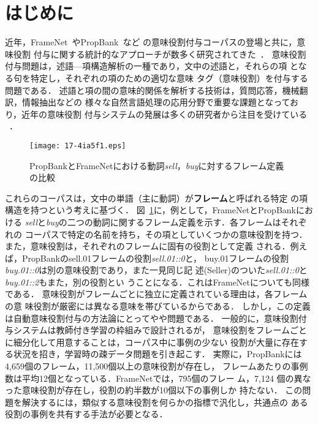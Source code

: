 \documentclass[japanese]{jnlp_1.4}
\begin{document}
\maketitle


\section{はじめに}
\label{section:introduction}

近年，FrameNet~やPropBank~など
の意味役割付与コーパスの登場と共に，意味役割
付与に関する統計的なアプローチが数多く研究されてきた~．
意味役割付与問題は，述語—項構造解析の一種であり，文中の述語と，それらの項
となる句を特定し，それぞれの項のための適切な意味
タグ（意味役割）を付与する問題である．
述語と項の間の意味的関係を解析する技術は，質問応答，機械翻訳，情報抽出などの
様々な自然言語処理の応用分野で重要な課題となっており，近年の意味役割
付与システムの発展は多くの研究者から注目を受けている
~．


\begin{figure}[b]
\begin{center}
\texttt{[image: 17-4ia5f1.eps]}
\end{center}
\caption{PropBankとFrameNetにおける動詞{\it sell}，{\it buy}に対するフレーム定義の比較}
\label{framenet-propbank}
\end{figure}


これらのコーパスは，文中の単語（主に動詞）が{\bf フレーム}と呼ばれる特定
の項構造を持つという考えに基づく．
図~\ref{framenet-propbank}に，例として，FrameNetとPropBankにおける
{\it sell}と{\it buy}の二つの動詞に関するフレーム定義を示す．各フレームはそれぞれの
コーパスで特定の名前を持ち，その項としていくつかの意味役割を持つ．
また，意味役割は，それぞれのフレームに固有の役割として定義
される．例えば，PropBankのsell.01フレームの役割{\it sell.01::0}と，
buy.01フレームの役割{\it buy.01::0}は別の意味役割であり，また一見同じ記
述(Seller)のついた{\it sell.01::0}と{\it buy.01::2}もまた，別の役割とい
うことになる．これはFrameNetについても同様である．
意味役割がフレームごとに独立に定義されている理由は，各フレームの意
味役割が厳密には異なる意味を帯びているからである．
しかし，この定義は自動意味役割付与の方法論にとってやや問題である．
一般的に，意味役割付与システムは教師付き学習の枠組みで設計されるが，
意味役割をフレームごとに細分化して用意することは，コーパス中に事例の少ない
役割が大量に存在する状況を招き，学習時の疎データ問題を引き起こす．
実際に，PropBankには4,659個のフレーム，11,500個以上の意味役割が存在し，
フレームあたりの事例数は平均12個となっている．FrameNetでは，795個のフレー
ム，7,124 個の異なった意味役割が存在し，役割の約半数が10個以下の事例しか
持たない．
この問題を解決するには，類似する意味役割を何らかの指標で汎化し，共通点の
ある役割の事例を共有する手法が必要となる．
\end{document}
